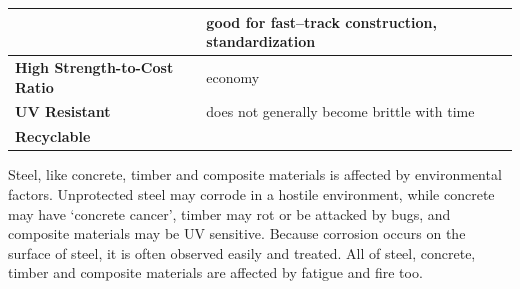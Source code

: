 \begin{table}[H]
\begin{tabular}{l|m{10cm}}
	                                     & good for fast--track construction, standardization                                  \\ \midrule
	\textbf{High Strength-to-Cost Ratio} & economy                                                                             \\ \midrule
	\textbf{UV Resistant}                & does not generally become brittle with time                                         \\ \midrule
	\textbf{Recyclable}                  &                                                                                     \\ \bottomrule
\end{tabular}
\end{table}
Steel, like concrete, timber and composite materials is affected by environmental factors. Unprotected steel may corrode in a hostile environment, while concrete may have `concrete cancer', timber may rot or be attacked by bugs, and composite materials may be UV sensitive. Because corrosion occurs on the surface of steel, it is often observed easily and treated. All of steel, concrete, timber and composite materials are affected by fatigue and fire too.
